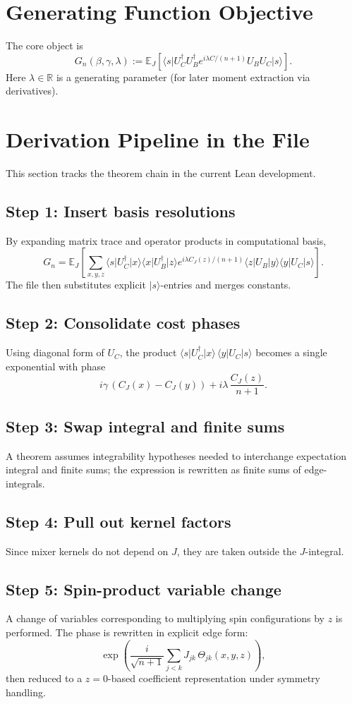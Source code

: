 \documentclass[11pt]{article}
\newcommand{\R}{\mathbb{R}}
\newcommand{\E}{\mathbb{E}}
\newcommand{\ket}[1]{\lvert #1\rangle}
\newcommand{\bra}[1]{\langle #1\rvert}
\begin{document}
\section{Generating Function Objective}
The core object is
\[
  G_{n}(\beta,\gamma,\lambda)
  :=\E_J\!\left[\bra{s}U_C^\dagger U_B^\dagger e^{i\lambda C/(n+1)}U_B U_C\ket{s}\right].
\]
Here \(\lambda\in\R\) is a generating parameter (for later moment extraction via derivatives).

\section{Derivation Pipeline in the File}
This section tracks the theorem chain in the current Lean development.

\subsection{Step 1: Insert basis resolutions}
By expanding matrix trace and operator products in computational basis,
\[
  G_n = \E_J\!\left[\sum_{x,y,z}
    \bra{s}U_C^\dagger\ket{x}
    \bra{x}U_B^\dagger\ket{z}
    e^{i\lambda C_J(z)/(n+1)}
    \bra{z}U_B\ket{y}
    \bra{y}U_C\ket{s}
  \right].
\]
The file then substitutes explicit \(\ket{s}\)-entries and merges constants.

\subsection{Step 2: Consolidate cost phases}
Using diagonal form of \(U_C\), the product
\(
\bra{s}U_C^\dagger\ket{x}\,\bra{y}U_C\ket{s}
\)
becomes a single exponential with phase
\[
  i\gamma\,(C_J(x)-C_J(y)) + i\lambda\,\frac{C_J(z)}{n+1}.
\]

\subsection{Step 3: Swap integral and finite sums}
A theorem assumes integrability hypotheses needed to interchange expectation integral and finite sums; the expression is rewritten as finite sums of edge-integrals.

\subsection{Step 4: Pull out kernel factors}
Since mixer kernels do not depend on \(J\), they are taken outside the \(J\)-integral.

\subsection{Step 5: Spin-product variable change}
A change of variables corresponding to multiplying spin configurations by \(z\) is performed. The phase is rewritten in explicit edge form:
\[
  \exp\!\left(
    \frac{i}{\sqrt{n+1}}\sum_{j<k}J_{jk}\,\Theta_{jk}(x,y,z)
  \right),
\]
then reduced to a \(z=0\)-based coefficient representation under symmetry handling.
\end{document}
